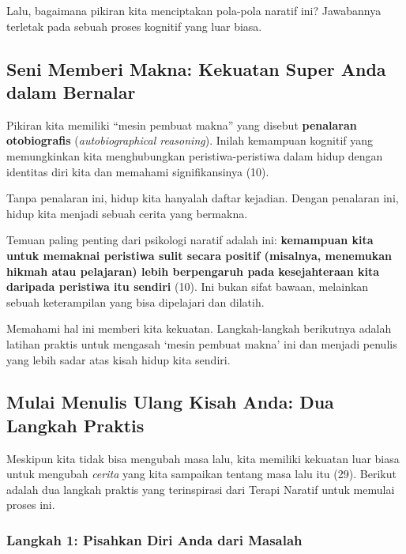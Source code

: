 \documentclass[
  letterpaper,
  DIV=11,
  numbers=noendperiod]{scrreprt}
\begin{document}
Lalu, bagaimana pikiran kita menciptakan pola-pola naratif ini?
Jawabannya terletak pada sebuah proses kognitif yang luar biasa.

\subsection{\texorpdfstring{\textbf{Seni Memberi Makna: Kekuatan Super
Anda dalam
Bernalar}}{Seni Memberi Makna: Kekuatan Super Anda dalam Bernalar}}\label{seni-memberi-makna-kekuatan-super-anda-dalam-bernalar}

Pikiran kita memiliki ``mesin pembuat makna'' yang disebut
\textbf{penalaran otobiografis} (\emph{autobiographical reasoning}).
Inilah kemampuan kognitif yang memungkinkan kita menghubungkan
peristiwa-peristiwa dalam hidup dengan identitas diri kita dan memahami
signifikansinya (10).

Tanpa penalaran ini, hidup kita hanyalah daftar kejadian. Dengan
penalaran ini, hidup kita menjadi sebuah cerita yang bermakna.

Temuan paling penting dari psikologi naratif adalah ini:
\textbf{kemampuan kita untuk memaknai peristiwa sulit secara positif
(misalnya, menemukan hikmah atau pelajaran) lebih berpengaruh pada
kesejahteraan kita daripada peristiwa itu sendiri} (10). Ini bukan sifat
bawaan, melainkan sebuah keterampilan yang bisa dipelajari dan dilatih.

Memahami hal ini memberi kita kekuatan. Langkah-langkah berikutnya
adalah latihan praktis untuk mengasah `mesin pembuat makna' ini dan
menjadi penulis yang lebih sadar atas kisah hidup kita sendiri.

\subsection{\texorpdfstring{\textbf{Mulai Menulis Ulang Kisah Anda: Dua
Langkah
Praktis}}{Mulai Menulis Ulang Kisah Anda: Dua Langkah Praktis}}\label{mulai-menulis-ulang-kisah-anda-dua-langkah-praktis}

Meskipun kita tidak bisa mengubah masa lalu, kita memiliki kekuatan luar
biasa untuk mengubah \emph{cerita} yang kita sampaikan tentang masa lalu
itu (29). Berikut adalah dua langkah praktis yang terinspirasi dari
Terapi Naratif untuk memulai proses ini.

\subsubsection{Langkah 1: Pisahkan Diri Anda dari
Masalah}\label{langkah-1-pisahkan-diri-anda-dari-masalah}
\end{document}
